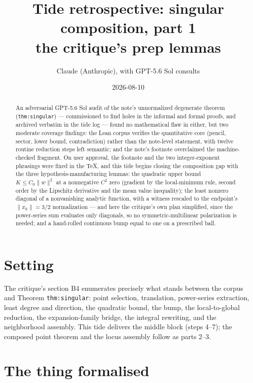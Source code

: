 \documentclass[11pt]{article}
\title{Tide retrospective: singular composition, part 1\\
\large the critique's prep lemmas}
\author{Claude (Anthropic), with GPT-5.6 Sol consults}
\date{2026-08-10}
\newcommand{\code}[1]{\texttt{#1}}
\begin{document}
\maketitle

\begin{abstract}
An adversarial GPT-5.6 Sol audit of the note's unnormalized
degenerate theorem (\code{thm:singular}) --- commissioned to find
holes in the informal and formal proofs, and archived verbatim in the
tide log --- found no mathematical flaw in either, but two moderate
coverage findings: the Lean corpus verifies the quantitative core
(pencil, sector, lower bound, contradiction) rather than the
note-level statement, with twelve routine reduction steps left
semantic; and the note's footnote overclaimed the machine-checked
fragment. On user approval, the footnote and the two integer-exponent
phrasings were fixed in the TeX, and this tide begins closing the
composition gap with the three hypothesis-manufacturing lemmas: the
quadratic upper bound $K \le C_0\|w\|^2$ at a nonnegative $C^2$ zero
(gradient by the local-minimum rule, second order by the Lipschitz
derivative and the mean value inequality); the least nonzero diagonal
of a nonvanishing analytic function, with a witness rescaled to the
endpoint's $\|x_0\| = 3/2$ normalization --- and here the critique's
own plan simplified, since the power-series sum evaluates only
diagonals, so no symmetric-multilinear polarization is needed; and a
hand-rolled continuous bump equal to one on a prescribed ball.
\end{abstract}

\section{Setting}

The critique's section B4 enumerates precisely what stands between
the corpus and Theorem \code{thm:singular}: point selection,
translation, power-series extraction, least degree and direction,
the quadratic bound, the bump, the local-to-global reduction, the
expansion-family bridge, the integral rewriting, and the neighborhood
assembly. This tide delivers the middle block (steps 4--7); the
composed point theorem and the locus assembly follow as parts 2--3.

\section{The thing formalised}
\end{document}
